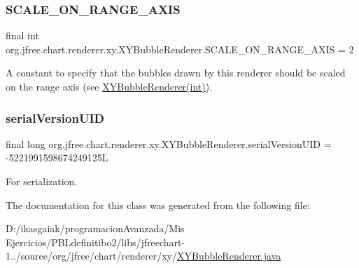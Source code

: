 \subsubsection{\texorpdfstring{S\+C\+A\+L\+E\+\_\+\+O\+N\+\_\+\+R\+A\+N\+G\+E\+\_\+\+A\+X\+IS}{SCALE\_ON\_RANGE\_AXIS}}
{\footnotesize\ttfamily final int org.\+jfree.\+chart.\+renderer.\+xy.\+X\+Y\+Bubble\+Renderer.\+S\+C\+A\+L\+E\+\_\+\+O\+N\+\_\+\+R\+A\+N\+G\+E\+\_\+\+A\+X\+IS = 2\hspace{0.3cm}{\ttfamily [static]}}

A constant to specify that the bubbles drawn by this renderer should be scaled on the range axis (see \mbox{\hyperlink{classorg_1_1jfree_1_1chart_1_1renderer_1_1xy_1_1_x_y_bubble_renderer_ac7a4c2b1d62ba09cd20fb7db9466316f}{X\+Y\+Bubble\+Renderer(int)}}). \mbox{\label{classorg_1_1jfree_1_1chart_1_1renderer_1_1xy_1_1_x_y_bubble_renderer_abbaaf95fc1d0a332a54b7d5a419cfb5f}} 
\subsubsection{\texorpdfstring{serial\+Version\+U\+ID}{serialVersionUID}}
{\footnotesize\ttfamily final long org.\+jfree.\+chart.\+renderer.\+xy.\+X\+Y\+Bubble\+Renderer.\+serial\+Version\+U\+ID = -\/5221991598674249125L\hspace{0.3cm}{\ttfamily [static]}}

For serialization. 

The documentation for this class was generated from the following file\+:\begin{DoxyCompactItemize}
\item 
D\+:/ikasgaiak/programacion\+Avanzada/\+Mis Ejercicios/\+P\+B\+Ldefinitibo2/libs/jfreechart-\/1../source/org/jfree/chart/renderer/xy/\mbox{\hyperlink{_x_y_bubble_renderer_8java}{X\+Y\+Bubble\+Renderer.\+java}}\end{DoxyCompactItemize}
